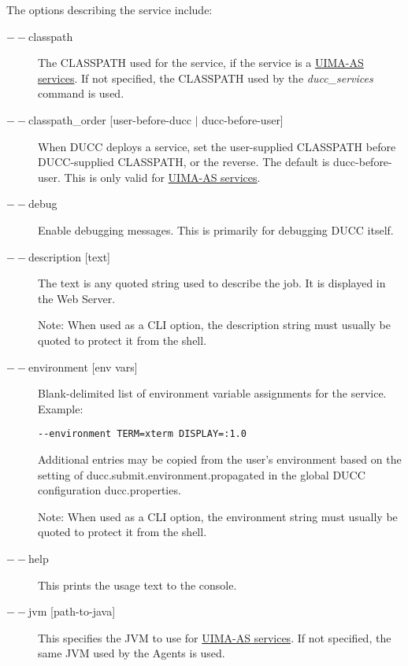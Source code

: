        The options describing the service include:
    \begin{description}

        \item[$--$classpath] The CLASSPATH used for the service, if the service is a
          \hyperref[sec:services.types]{UIMA-AS services}.  If not specified, the CLASSPATH used
          by the {\em ducc\_services} command is used.
          
        \item[$--$classpath\_order {[user-before-ducc $|$ ducc-before-user]} ] When DUCC deploys a service,
          set the user-supplied CLASSPATH before DUCC-supplied CLASSPATH, or the reverse. 
          The default is ducc-before-user. This is
          only valid for  \hyperref[sec:services.types]{UIMA-AS services}.
          
        \item[$--$debug ]
          Enable debugging messages. This is primarily for debugging DUCC itself. 
          
        \item[$--$description {[text]}] The text is any quoted string used to describe the job. It is
          displayed in the Web Server.

          Note: When used as a CLI option, the description string must usually be quoted to protect
          it from the shell.
    
        \item[$--$environment {[env vars]}] Blank-delimited list of environment variable
          assignments for the service. Example:
          \begin{verbatim}
--environment TERM=xterm DISPLAY=:1.0
          \end{verbatim}
             
          Additional entries may be copied from the user's environment based on the setting of
          ducc.submit.environment.propagated in the global DUCC configuration ducc.properties.

          Note: When used as a CLI option, the environment string must usually be
          quoted to protect it from the shell.
          
        \item[$--$help ] This prints the usage text to the console.

        \item[$--$jvm {[path-to-java]}] This specifies the JVM to use for 
          \hyperref[sec:services.types]{UIMA-AS services}. If not
          specified, the same JVM used by the Agents is used.  


\end{description}
